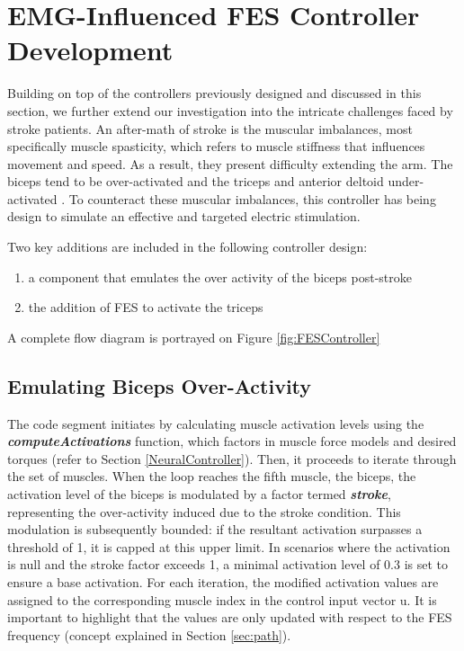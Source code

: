 \newpage
\section{EMG-Influenced FES Controller Development}

Building on top of the controllers previously designed and discussed in this section, we further extend our investigation into the intricate challenges faced by stroke patients. An after-math of stroke is the muscular imbalances, most specifically muscle spasticity, which refers to muscle stiffness that influences movement and speed. As a result, they present difficulty extending the arm. The biceps tend to be over-activated and the triceps and anterior deltoid under-activated \cite{IOL}. To counteract these muscular imbalances, this controller has being design to simulate an effective and targeted electric stimulation. 

Two key additions are included in the following controller design:

\begin{enumerate}
    \item a component that emulates the over activity of the biceps post-stroke 
    \item the addition of FES to activate the triceps
\end{enumerate}

A complete flow diagram is portrayed on Figure \ref{fig:FESController}

\subsection{Emulating Biceps Over-Activity}

The code segment initiates by calculating muscle activation levels using the \textbf{\textit{computeActivations}} function, which factors in muscle force models and desired torques  (refer to Section \ref{NeuralController}). Then, it proceeds to iterate through the set of  muscles. When the loop reaches the fifth muscle, the biceps, the activation level of the biceps is modulated by a factor termed \textbf{\textit{stroke}}, representing the over-activity induced due to the stroke condition. This modulation is subsequently bounded: if the resultant activation surpasses a threshold of 1, it is capped at this upper limit. In scenarios where the activation is null and the stroke factor exceeds 1, a minimal activation level of 0.3 is set to ensure a base activation. For each iteration, the modified activation values are assigned to the corresponding muscle index in the control input vector u. It is important to highlight that the values are only updated with respect to the FES frequency (concept explained in Section \ref{sec:path}).

